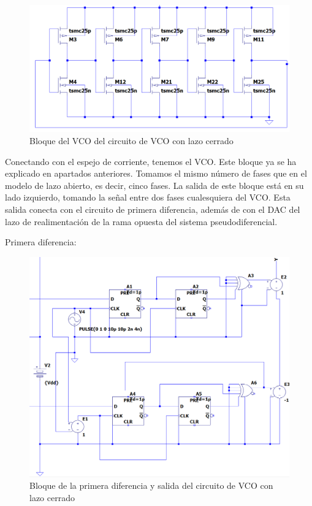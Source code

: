 \documentclass[12pt]{report} %
\begin{document}
	\begin{figure}[H]
		\includegraphics[width=\textwidth]{ltspice-vco-closed-vco-block.png}
		\caption[Bloque del VCO del circuito de VCO con lazo cerrado]{Bloque del VCO del circuito de VCO con lazo cerrado}
		\label{fig:ltspice-vco-closed-vco-block.png}
	\end{figure}

	Conectando con el espejo de corriente, tenemos el VCO. Este bloque ya se ha explicado en apartados anteriores. Tomamos el mismo número de fases que en el modelo de lazo abierto, es decir, cinco fases. La salida de este bloque está en su lado izquierdo, tomando la señal entre dos fases cualesquiera del VCO. Esta salida conecta con el circuito de primera diferencia, además de con el DAC del lazo de realimentación de la rama opuesta del sistema pseudodiferencial.

	Primera diferencia:
	
	\begin{figure}[H]
		\includegraphics[width=\textwidth]{ltspice-vco-closed-diff-module.PNG}
		\caption[Bloque de la primera diferencia y salida del circuito de VCO con lazo cerrado]{Bloque de la primera diferencia y salida del circuito de VCO con lazo cerrado}
		\label{fig:ltspice-vco-closed-diff-module.PNG}
	\end{figure}
\end{document}
